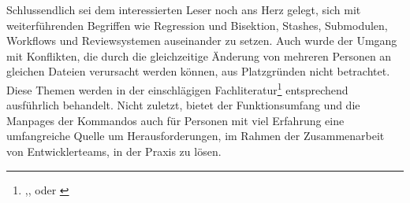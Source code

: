 Schlussendlich sei dem interessierten Leser noch ans Herz gelegt, sich mit
weiterführenden Begriffen wie Regression und Bisektion, Stashes, Submodulen,
Workflows und Reviewsystemen auseinander zu setzen. Auch wurde der Umgang mit
Konflikten, die durch die gleichzeitige Änderung von mehreren Personen an
gleichen Dateien verursacht werden können, aus Platzgründen nicht betrachtet.
Diese Themen werden in der einschlägigen
Fachliteratur\footnote{\cite{gitosp},\cite{progit},\cite{gitwf} oder \cite{cd}}
entsprechend ausführlich behandelt. Nicht zuletzt, bietet der Funktionsumfang
und die Manpages der Kommandos auch für Personen mit viel Erfahrung eine
umfangreiche Quelle um Herausforderungen, im Rahmen der Zusammenarbeit von
Entwicklerteams, in der Praxis zu lösen.
